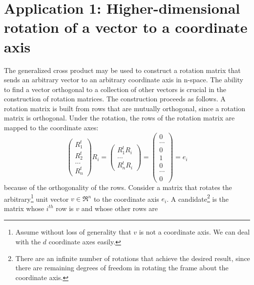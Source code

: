 \documentclass[10pt]{article}
\begin{document}
\clearpage

\section{Application 1: Higher-dimensional rotation of a vector to a coordinate axis}


The generalized cross product may be used to construct a rotation matrix
that sends an arbitrary vector to an arbitrary coordinate axis in n-space.
The ability to find a vector orthogonal to a collection of other vectors is crucial
in the construction of rotation matrices.
The construction proceeds as follows.
A rotation matrix is built from rows that are mutually orthogonal,
since a rotation matrix is orthogonal.
Under the rotation, 
the rows of the rotation matrix are mapped to the coordinate axes:
\[
\left(
\begin{array}{c}
R_1^t \\ R_2^t \\ \ldots \\ R_n^t
\end{array}
\right)
R_i
= 
\left(
\begin{array}{c}
R_1^t R_i \\ \ldots \\ R_n^t R_i
\end{array}
\right)
=
\left(
\begin{array}{c}
0 \\ \cdots \\ 0 \\ 1 \\ 0 \\ \cdots \\ 0
\end{array}
\right)
=
e_i
\]
because of the orthogonality of the rows.
Consider a matrix that rotates the arbitrary\footnote{Assume without loss of 
      generality that $v$ is not a coordinate axis.
      We can deal with the $d$ coordinate axes easily.} 
unit vector $v \in \Re^n$ to the coordinate axis $e_i$.
A candidate\footnote{There are an infinite number
  of rotations that achieve the desired result, 
  since there are remaining degrees of freedom in rotating
  the frame about the coordinate axis.} 
is the matrix whose $i^{th}$ row is $v$ and whose other rows are
\end{document}
